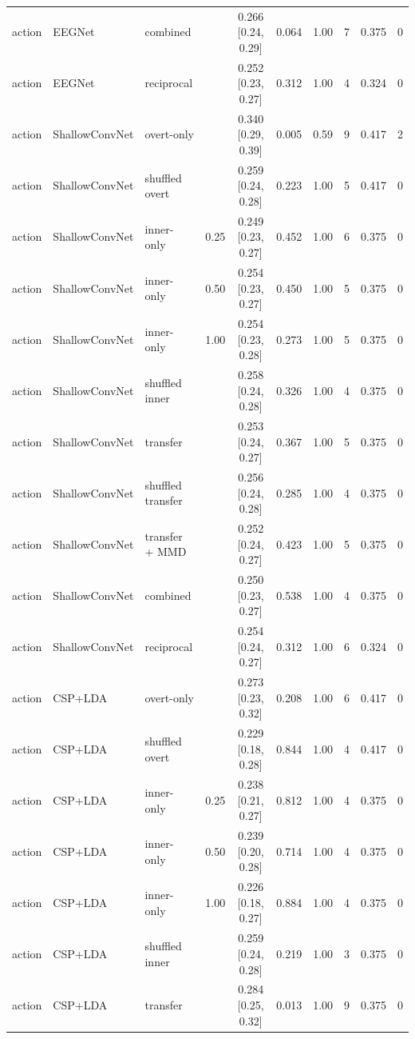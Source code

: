 \begin{longtable}{llllcccccc}
action & EEGNet & combined &  & 0.266 [0.24, 0.29] & 0.064 & 1.00 & 7 & 0.375 & 0 \\
action & EEGNet & reciprocal &  & 0.252 [0.23, 0.27] & 0.312 & 1.00 & 4 & 0.324 & 0 \\
action & ShallowConvNet & overt-only &  & 0.340 [0.29, 0.39] & 0.005 & 0.59 & 9 & 0.417 & 2 \\
action & ShallowConvNet & shuffled overt &  & 0.259 [0.24, 0.28] & 0.223 & 1.00 & 5 & 0.417 & 0 \\
action & ShallowConvNet & inner-only & 0.25 & 0.249 [0.23, 0.27] & 0.452 & 1.00 & 6 & 0.375 & 0 \\
action & ShallowConvNet & inner-only & 0.50 & 0.254 [0.23, 0.27] & 0.450 & 1.00 & 5 & 0.375 & 0 \\
action & ShallowConvNet & inner-only & 1.00 & 0.254 [0.23, 0.28] & 0.273 & 1.00 & 5 & 0.375 & 0 \\
action & ShallowConvNet & shuffled inner &  & 0.258 [0.24, 0.28] & 0.326 & 1.00 & 4 & 0.375 & 0 \\
action & ShallowConvNet & transfer &  & 0.253 [0.24, 0.27] & 0.367 & 1.00 & 5 & 0.375 & 0 \\
action & ShallowConvNet & shuffled transfer &  & 0.256 [0.24, 0.28] & 0.285 & 1.00 & 4 & 0.375 & 0 \\
action & ShallowConvNet & transfer + MMD &  & 0.252 [0.24, 0.27] & 0.423 & 1.00 & 5 & 0.375 & 0 \\
action & ShallowConvNet & combined &  & 0.250 [0.23, 0.27] & 0.538 & 1.00 & 4 & 0.375 & 0 \\
action & ShallowConvNet & reciprocal &  & 0.254 [0.24, 0.27] & 0.312 & 1.00 & 6 & 0.324 & 0 \\
action & CSP+LDA & overt-only &  & 0.273 [0.23, 0.32] & 0.208 & 1.00 & 6 & 0.417 & 0 \\
action & CSP+LDA & shuffled overt &  & 0.229 [0.18, 0.28] & 0.844 & 1.00 & 4 & 0.417 & 0 \\
action & CSP+LDA & inner-only & 0.25 & 0.238 [0.21, 0.27] & 0.812 & 1.00 & 4 & 0.375 & 0 \\
action & CSP+LDA & inner-only & 0.50 & 0.239 [0.20, 0.28] & 0.714 & 1.00 & 4 & 0.375 & 0 \\
action & CSP+LDA & inner-only & 1.00 & 0.226 [0.18, 0.27] & 0.884 & 1.00 & 4 & 0.375 & 0 \\
action & CSP+LDA & shuffled inner &  & 0.259 [0.24, 0.28] & 0.219 & 1.00 & 3 & 0.375 & 0 \\
action & CSP+LDA & transfer &  & 0.284 [0.25, 0.32] & 0.013 & 1.00 & 9 & 0.375 & 0 \\

\end{longtable}
